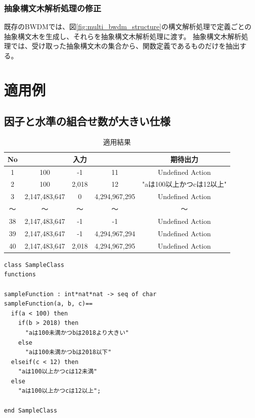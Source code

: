\documentclass[uplatex, report, a4j, 10pt]{jsbook}
\begin{document}
\subsection{抽象構文木解析処理の修正}
既存のBWDMでは、図\ref{fig:multi_bwdm_structure}の構文解析処理で定義ごとの抽象構文木を生成し、それらを抽象構文木解析処理に渡す。
抽象構文木解析処理では、受け取った抽象構文木の集合から、関数定義であるものだけを抽出する。

\chapter{適用例}\label{cha:Indication}
\section{因子と水準の組合せ数が大きい仕様}

\begin{table}[t]
  \begin{center}
    \caption{適用結果}
    \label{tab:pict4javaTekiyourei}
    \begin{tabular}{c|c|c|c|c}
      No & \multicolumn{3}{|c|}{入力} & 期待出力                                             \\
      \hline
      \hline
      1  & 100                        & -1       & 11            & Undefined Action          \\
      2  & 100                        & 2,018    & 12            & "aは100以上かつcは12以上" \\
      3  & 2,147,483,647              & 0        & 4,294,967,295 & Undefined Action          \\
      〜 & 〜                         & 〜       & 〜            & 〜                        \\
      38 & 2,147,483,647              & -1       & -1            & Undefined Action          \\
      39 & 2,147,483,647              & -1       & 4,294,967,294 & Undefined Action          \\
      40 & 2,147,483,647              & 2,018    & 4,294,967,295 & Undefined Action          \\
      \hline
    \end{tabular}
  \end{center}
\end{table}

\lstset{language=}
\noindent\begin{minipage}{\textwidth}
\begin{lstlisting}[caption=因子が3、水準が（6 6 6）の関数を持つVDM++仕様。,label=fig:pict4javaSampleVdm]
class SampleClass
functions

sampleFunction : int*nat*nat -> seq of char
sampleFunction(a, b, c)==
  if(a < 100) then
    if(b > 2018) then
      "aは100未満かつbは2018より大きい"
    else
      "aは100未満かつbは2018以下"
  elseif(c < 12) then
    "aは100以上かつcは12未満"
  else
    "aは100以上かつcは12以上";

end SampleClass
\end{lstlisting}
\end{minipage}
\end{document}
